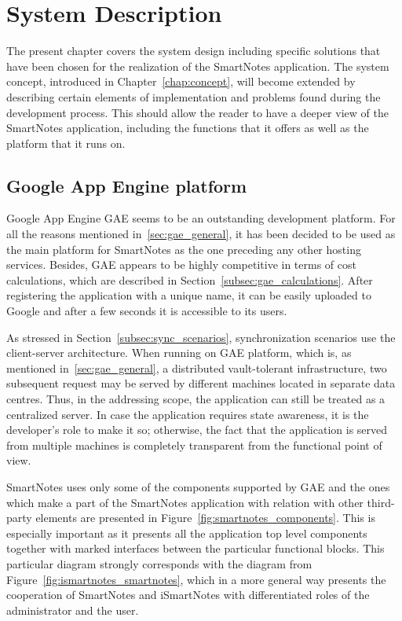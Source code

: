 \chapter{System Description}\label{chap:sys_description}
The present chapter covers the system design including specific solutions that have been chosen for the realization of the SmartNotes application. The system concept, introduced in Chapter~\ref{chap:concept}, will become extended by describing certain elements of implementation and problems found during the development process. This should allow the reader to have a deeper view of the SmartNotes application, including the functions that it offers as well as the platform that it runs on.
\section{Google App Engine platform}\label{sec:gae}
Google App Engine GAE seems to be an outstanding development platform. For all the reasons mentioned in~\ref{sec:gae_general}, it has been decided to be used as the main platform for SmartNotes as the one preceding any other hosting services. Besides, GAE appears to be highly competitive in terms of cost calculations, which are described in Section~\ref{subsec:gae_calculations}. After registering the application with a unique name, it can be easily uploaded to Google and after a few seconds it is accessible to its users.
 
As stressed in Section~\ref{subsec:sync_scenarios}, synchronization scenarios use the client-server architecture. When running on GAE platform, which is, as mentioned in~\ref{sec:gae_general}, a distributed vault-tolerant infrastructure, two subsequent request may be served by different machines located in separate data centres. Thus, in the addressing scope, the application can still be treated as a centralized server. In case the application requires state awareness, it is the developer's role to make it so; otherwise, the fact that the application is served from multiple machines is completely transparent from the functional point of view.
 
SmartNotes uses only some of the components supported by GAE and the ones which make a part of the SmartNotes application with relation with other third-party elements are presented in Figure~\ref{fig:smartnotes_components}. This is especially important as it presents all the application top level components together with marked interfaces between the particular functional blocks. This particular diagram strongly corresponds with the diagram from Figure~\ref{fig:ismartnotes_smartnotes}, which in a more general way presents the cooperation of SmartNotes and iSmartNotes with differentiated roles of the administrator and the user.
 
